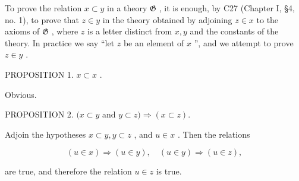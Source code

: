 To prove the relation \(x \subset y\) in a theory \(\mathfrak{G}\) , it is enough, by C27 (Chapter I, §4, no. 1), to prove that \(z \in y\) in the theory obtained by adjoining \(z \in x\) to the axioms of \(\mathfrak{G}\) , where \(z\) is a letter distinct from \(x, y\) and the constants of the theory. In practice we say ``let \(z\) be an element of \(x\) '', and we attempt to prove \(z \in y\) .

PROPOSITION 1. \(x \subset x\) .

Obvious.

PROPOSITION 2. \((x\subset y\) and \(y\subset z)\Longrightarrow (x\subset z).\)

Adjoin the hypotheses \(x \subset y, y \subset z\) , and \(u \in x\) . Then the relations

\[
(u \in x) \Longrightarrow (u \in y), \quad (u \in y) \Longrightarrow (u \in z),
\]

are true, and therefore the relation \(u \in z\) is true.

